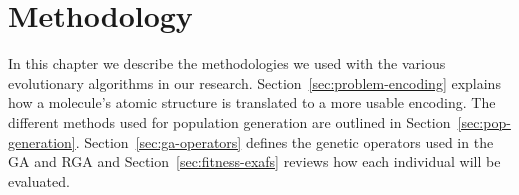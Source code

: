 \chapter{Methodology}

In this chapter we describe the methodologies we used with the various evolutionary algorithms in our research. Section~\ref{sec:problem-encoding} explains how a molecule's atomic structure is translated to a more usable encoding. The different methods used for population generation are outlined in Section~\ref{sec:pop-generation}. Section~\ref{sec:ga-operators} defines the genetic operators used in the GA and RGA and Section~\ref{sec:fitness-exafs} reviews how each individual will be evaluated.





% 